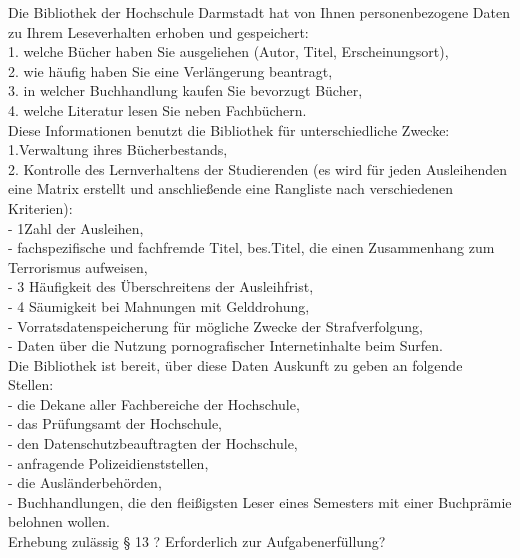 \documentclass[a4paper,10pt]{scrartcl}
\begin{document}
Die Bibliothek der Hochschule Darmstadt hat von Ihnen 
personenbezogene Daten zu Ihrem Leseverhalten erhoben und  
gespeichert:\\
	1. welche Bücher haben Sie ausgeliehen (Autor, Titel,    
         Erscheinungsort),\\
	2. wie häufig haben Sie eine Verlängerung beantragt,\\
	3. in welcher Buchhandlung kaufen Sie bevorzugt Bücher,\\
	4. welche Literatur lesen Sie neben Fachbüchern.\\

Diese Informationen benutzt die Bibliothek für unterschiedliche 
Zwecke:\\
	1.Verwaltung ihres Bücherbestands,\\
	2. Kontrolle des Lernverhaltens der Studierenden (es wird für   
         jeden Ausleihenden eine Matrix erstellt und anschließende eine 
         Rangliste nach verschiedenen Kriterien):\\
		- 1Zahl der Ausleihen,\\
		- fachspezifische und fachfremde Titel, bes.Titel, die einen Zusammenhang zum     
                  Terrorismus aufweisen,\\
		- 3 Häufigkeit des Überschreitens der Ausleihfrist,\\
		- 4 Säumigkeit bei Mahnungen mit Gelddrohung,\\
		- Vorratsdatenspeicherung für mögliche Zwecke der Strafverfolgung,\\
	      - Daten über die Nutzung pornografischer Internetinhalte beim Surfen.\\
	      
Die Bibliothek ist bereit, über diese Daten Auskunft zu geben an 
folgende Stellen:\\

	- die Dekane aller Fachbereiche der Hochschule,\\
	- das Prüfungsamt der Hochschule,\\
	- den Datenschutzbeauftragten der Hochschule,\\
	- anfragende Polizeidienststellen,\\
	- die Ausländerbehörden,\\
	- Buchhandlungen, die den fleißigsten Leser eines Semesters mit 
        einer Buchprämie belohnen wollen.\\
        
 Erhebung zulässig § 13 ? Erforderlich zur Aufgabenerfüllung?\\
 
\end{document}
